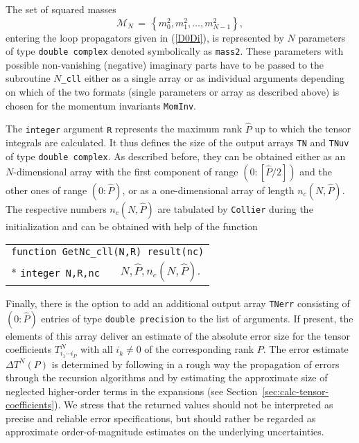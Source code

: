 \documentclass[preprint,sort&compress,12pt]{elsarticle}
\makeatletter
\def\bce{\begin{center}}
\def\ece{\end{center}}
\def\refeq#1{\mbox{(\ref{#1})}}
\def\refse#1{\mbox{Section~\ref{#1}}}
\newlength{\parwidth}\newlength{\colonewidth}%
\newlength{\restpageheight}
\newcommand{\cpcsuptable}[2]
{\settowidth{\colonewidth}{#1}\setlength{\parwidth}{\textwidth}%
\addtolength{\parwidth}{-\colonewidth}\addtolength{\parwidth}{-3em}%
\bce
\setlength{\restpageheight}{\@colroom}\addtolength{\restpageheight}{-\pagetotal}
\ifdim \restpageheight<20pt \pagebreak\fi
\begin{supertabular}[l]{p{\colonewidth}@{ }c@{ }p{\parwidth}}
#2
\end{supertabular}%
\ece
}%
\renewcommand{\cpcsuptable}[2]%
{\settowidth{\colonewidth}{#1}\setlength{\parwidth}{\textwidth}%
\addtolength{\parwidth}{-\colonewidth}\addtolength{\parwidth}{-3em}%
\begin{center}
\setlength{\restpageheight}{\@colroom}\addtolength{\restpageheight}{-\pagetotal}%
\ifdim \restpageheight<20pt \pagebreak\fi
\begin{supertabular}[l]{p{\colonewidth}@{ : }p{\parwidth}}%
#2
\end{supertabular}%
\end{center}
}%
\makeatother
\begin{document}
The set of squared masses
\begin{equation}
  \mathcal{M}_{N}\,=\,\left\{m_0^2,m_1^2,\ldots,m_{N-1}^2\right\},\label{eq:masses}
\end{equation}
entering the loop propagators given in \refeq{D0Di}, is represented by
$N$ parameters of type {\tt double complex} denoted symbolically as
{\tt mass2}. These parameters with possible non-vanishing (negative)
imaginary parts have to be passed to the subroutine {\tt $N$\_cll}
either as a single array or as individual arguments depending on which
of the two formats (single parameters or array as described above) is
chosen for the momentum invariants {\tt MomInv}.

The {\tt integer} argument {\tt R} represents the maximum rank
$\widehat{P}$ up to which the tensor integrals are calculated.%
It thus defines the size of the output arrays {\tt TN} and {\tt TNuv}
of type {\tt double complex}. As described before, they can be
obtained either as an $N$-dimensional array with the first component
of range $(0\!:\![\widehat{P}/2])$ and the other ones of range
$(0\!:\!{\widehat{P}})$, or as a one-dimensional array of length
$n_c(N,\widehat{P})$.  The respective numbers $n_c(N,\widehat{P})$ are
tabulated by {\tt Collier} during the initialization and can be
obtained with help of the function
\cpcsuptable{\tt integer N,R,nc }{%
\multicolumn{2}{l}{\tt function {GetNc}\_cll(N,R) result(nc)}\\*
\tt integer N,R,nc & $N,\widehat{P},n_c(N,\widehat{P})$\;.\\
}

Finally, there is the option to add an additional output array
{\tt TNerr} consisting of $({0\!:\!{\widehat{P}}})$ entries of type
{\tt double precision} to the list of arguments. If present, the
elements of this array deliver an estimate of the absolute error size
for the tensor coefficients $T^N_{i_1\cdots i_P}$ with all $i_k\neq 0$
of the corresponding rank $P$.  The error estimate $\Delta T^N(P)$ is
determined by following in a rough way the propagation of errors
through the recursion algorithms and by estimating the approximate
size of neglected higher-order terms in the expansions (see
\refse{sec:calc-tensor-coefficients}).  We stress that the returned
values should not be interpreted as precise and reliable error
specifications,
but should rather be regarded as
approximate order-of-magnitude 
estimates on the underlying uncertainties.
\end{document}
